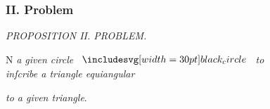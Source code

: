 \documentclass[11pt,preview]{standalone}
\begin{document}
\subsubsection{II. Problem}

\begin{minipage}[t]{0.43\textwidth}
    \vspace{20pt}
    
\end{minipage}%
\hfill
\begin{minipage}[t]{0.54\textwidth}
    \begin{center}
        \textit{PROPOSITION II. PROBLEM.}\label{book4pr2} \\
    \end{center}

    \hfill

    \begin{center}
        \raggedright \lettrine[lines=3, loversize=1, nindent=0pt]{}{}N \textit{a given circle} $\img[0][0][30]{black_circle}$ \textit{to\\ inſcribe a triangle equiangular}
    \end{center}
    \vspace{1ex}
    \textit{to a given triangle}.
\end{minipage}

\hfill
\end{document}
